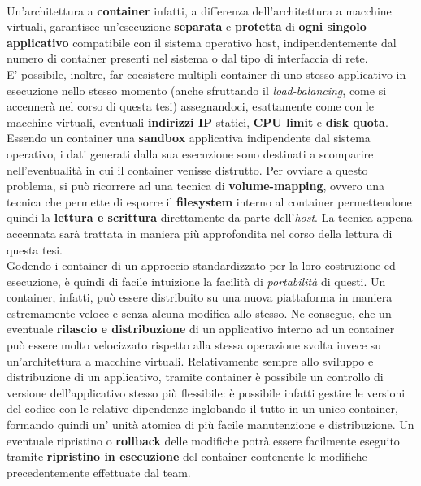 \\Un'architettura a \textbf{container} infatti, a differenza dell'architettura a macchine virtuali, garantisce un'esecuzione \textbf{separata} e \textbf{protetta} di \textbf{ogni singolo applicativo} compatibile con il sistema operativo host, indipendentemente dal numero di container presenti nel sistema o dal tipo di interfaccia di rete. \\
E' possibile, inoltre, far coesistere multipli container di uno stesso applicativo in esecuzione nello stesso momento (anche sfruttando il \textit{\gls{load-balancing}}, come si accennerà nel corso di questa tesi) assegnandoci, esattamente come con le macchine virtuali, eventuali \textbf{indirizzi IP} statici, \textbf{CPU limit} e \textbf{disk quota}.\\
Essendo un container una \textbf{\gls{sandbox}} applicativa indipendente dal sistema operativo, i dati generati dalla sua esecuzione sono destinati a scomparire nell'eventualità in cui il container venisse distrutto. Per ovviare a questo problema, si può ricorrere ad una tecnica di \textbf{volume-mapping}, ovvero una tecnica che permette di esporre il \textbf{\gls{filesystem}} interno al container permettendone quindi la \textbf{lettura e scrittura} direttamente da parte dell'\textit{host}. La tecnica appena accennata sarà trattata in maniera più approfondita nel corso della lettura di questa tesi.\\
Godendo i container di un approccio standardizzato per la loro costruzione ed esecuzione, è quindi di facile intuizione la facilità di \textit{portabilità} di questi. Un container, infatti, può essere distribuito su una nuova piattaforma in maniera estremamente veloce e senza alcuna modifica allo stesso. Ne consegue, che un eventuale \textbf{rilascio e distribuzione} di un applicativo interno ad un container può essere molto velocizzato rispetto alla stessa operazione svolta invece su un'architettura a macchine virtuali. Relativamente sempre allo sviluppo e distribuzione di un applicativo, tramite container è possibile un controllo di versione dell'applicativo stesso più flessibile: è possibile infatti gestire le versioni del codice con le relative dipendenze inglobando il tutto in un unico container, formando quindi un' unità atomica di più facile manutenzione e distribuzione. Un eventuale ripristino o \textbf{\gls{rollback}} delle modifiche potrà essere facilmente eseguito tramite \textbf{ripristino in esecuzione} del container contenente le modifiche precedentemente effettuate dal team.\\
